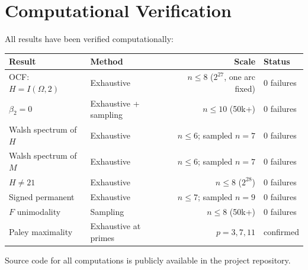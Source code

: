 \documentclass[12pt,reqno]{amsart}
\theoremstyle{plain}
\theoremstyle{definition}
\theoremstyle{remark}
\begin{document}
\section{Computational Verification}\label{sec:computation}

All results have been verified computationally:

\begin{center}
\begin{tabular}{@{}llrl@{}}
\toprule
Result & Method & Scale & Status \\
\midrule
OCF: $H = I(\Omega, 2)$ & Exhaustive & $n \leq 8$ ($2^{27}$, one arc fixed) & 0 failures \\
$\beta_2 = 0$ & Exhaustive + sampling & $n \leq 10$ (50k+) & 0 failures \\
Walsh spectrum of $H$ & Exhaustive & $n \leq 6$; sampled $n = 7$ & 0 failures \\
Walsh spectrum of $M$ & Exhaustive & $n \leq 6$; sampled $n = 7$ & 0 failures \\
$H \neq 21$ & Exhaustive & $n \leq 8$ ($2^{28}$) & 0 failures \\
Signed permanent & Exhaustive & $n \leq 7$; sampled $n = 9$ & 0 failures \\
$F$ unimodality & Sampling & $n \leq 8$ (50k+) & 0 failures \\
Paley maximality & Exhaustive at primes & $p = 3, 7, 11$ & confirmed \\
\bottomrule
\end{tabular}
\end{center}

Source code for all computations is publicly available in the project repository.
\end{document}

